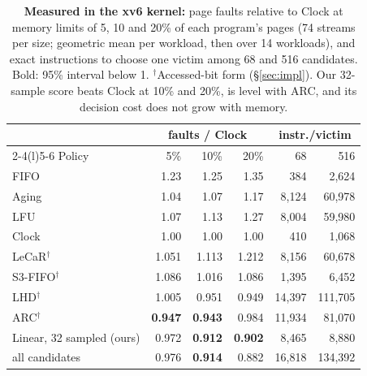 \documentclass{article}
\newcommand{\clock}{Clock\xspace}
\begin{document}
\begin{table}[t]
\caption{\textbf{Measured in the xv6 kernel:} page faults relative to \clock at memory
limits of 5, 10 and 20\% of each program's pages (74 streams per size; geometric mean per
workload, then over 14 workloads), and exact instructions to choose one victim among 68
and 516 candidates. Bold: 95\% interval below 1. $^\dagger$Accessed-bit form
(\S\ref{sec:impl}). Our 32-sample score beats \clock at 10\% and 20\%, is level with ARC,
and its decision cost does not grow with memory.}
\label{tab:teaser}
\vskip 0.1in
\begin{center}
\begin{small}
\setlength{\tabcolsep}{2.5pt}
\begin{tabular}{@{}lrrrrr@{}}
\toprule
 & \multicolumn{3}{c}{faults / \clock} & \multicolumn{2}{c}{instr./victim} \\
\cmidrule(lr){2-4}\cmidrule(l){5-6}
Policy & 5\% & 10\% & 20\% & 68 & 516 \\
\midrule
FIFO                 & 1.23  & 1.25  & 1.35  & 384    & 2,624 \\
Aging                & 1.04  & 1.07  & 1.17  & 8,124  & 60,978 \\
LFU                  & 1.07  & 1.13  & 1.27  & 8,004  & 59,980 \\
\clock               & 1.00  & 1.00  & 1.00  & 410    & 1,068 \\
LeCaR$^\dagger$      & 1.051 & 1.113 & 1.212 & 8,156  & 60,678 \\
S3-FIFO$^\dagger$    & 1.086 & 1.016 & 1.086 & 1,395  & 6,452 \\
LHD$^\dagger$        & 1.005 & 0.951 & 0.949 & 14,397 & 111,705 \\
ARC$^\dagger$        & \textbf{0.947} & \textbf{0.943} & 0.984 & 11,934 & 81,070 \\
\midrule
Linear, 32 sampled (ours) & 0.972 & \textbf{0.912} & \textbf{0.902} & 8,465 & 8,880 \\
\quad all candidates & 0.976 & \textbf{0.914} & 0.882 & 16,818 & 134,392 \\
\bottomrule
\end{tabular}
\end{small}
\end{center}
\vskip -0.1in
\end{table}
\end{document}
